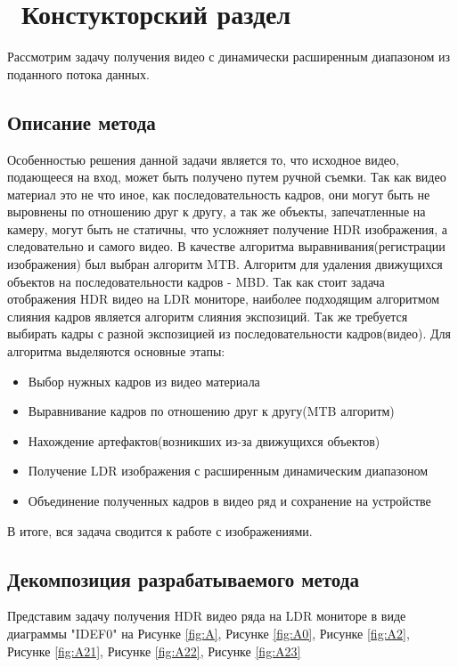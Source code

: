 \chapter{ Констукторский раздел}
\label{cha:design}

Рассмотрим задачу получения видео с динамически расширенным диапазоном из поданного потока данных. 

\section{ Описание метода}

    Особенностью решения данной задачи является то, что исходное видео, подающееся на вход, может быть получено путем ручной съемки. Так как видео материал это не что иное, как последовательность кадров, они могут быть не выровнены по отношению друг к другу, а так же объекты, запечатленные на камеру, могут быть не статичны, что усложняет получение HDR изображения, а следовательно и самого видео. В качестве алгоритма выравнивания(регистрации изображения) был выбран алгоритм MTB\cite{bib4}. Алгоритм для удаления движущихся объектов на последовательности кадров - MBD\cite{bib5}. Так как стоит задача отображения HDR видео на LDR мониторе, наиболее подходящим алгоритмом слияния кадров является алгоритм слияния экспозиций\cite{bib7}. Так же требуется выбирать кадры с разной экспозицией из последовательности кадров(видео). Для алгоритма выделяются основные этапы:

\begin{itemize}
    \item Выбор нужных кадров из видео материала
    \item Выравнивание кадров по отношению друг к другу(MTB алгоритм)
    \item Нахождение артефактов(возникших из-за движущихся объектов)
    \item Получение LDR изображения с расширенным динамическим диапазоном
    \item Объединение полученных кадров в видео ряд и сохранение на устройстве
\end{itemize}

В итоге, вся задача сводится к работе с изображениями.

\section{ Декомпозиция разрабатываемого метода}

Представим задачу получения HDR видео ряда на LDR мониторе в виде диаграммы "IDEF0" на Рисунке \ref{fig:A}, Рисунке \ref{fig:A0}, Рисунке \ref{fig:A2}, Рисунке \ref{fig:A21}, Рисунке \ref{fig:A22}, Рисунке \ref{fig:A23}

